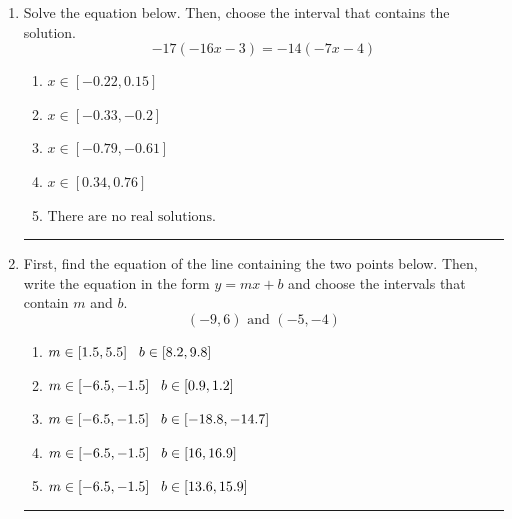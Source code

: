 \documentclass[14pt]{extbook}
\newcommand{\litem}[1]{\item#1\hspace*{-1cm}\rule{\textwidth}{0.4pt}}
\begin{document}
\begin{enumerate}
{\begin{enumerate}[label=\Alph*.]
\end{enumerate} }
\litem{
Solve the equation below. Then, choose the interval that contains the solution.\[ -17(-16x -3) = -14(-7x -4) \]\begin{enumerate}[label=\Alph*.]
\item \( x \in [-0.22, 0.15] \)
\item \( x \in [-0.33, -0.2] \)
\item \( x \in [-0.79, -0.61] \)
\item \( x \in [0.34, 0.76] \)
\item \( \text{There are no real solutions.} \)

\end{enumerate} }
\litem{
First, find the equation of the line containing the two points below. Then, write the equation in the form $ y=mx+b $ and choose the intervals that contain $m$ and $b$.\[ (-9, 6) \text{ and } (-5, -4) \]\begin{enumerate}[label=\Alph*.]
\item \( m \in [1.5, 5.5] \hspace*{3mm} b \in [8.2, 9.8] \)
\item \( m \in [-6.5, -1.5] \hspace*{3mm} b \in [0.9, 1.2] \)
\item \( m \in [-6.5, -1.5] \hspace*{3mm} b \in [-18.8, -14.7] \)
\item \( m \in [-6.5, -1.5] \hspace*{3mm} b \in [16, 16.9] \)
\item \( m \in [-6.5, -1.5] \hspace*{3mm} b \in [13.6, 15.9] \)


\end{enumerate}}
\end{enumerate}
\end{document}

